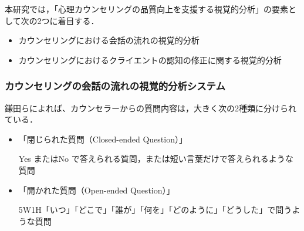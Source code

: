\documentclass[shuuron]{kuee}
\begin{document}
%




本研究では，「心理カウンセリングの品質向上を支援する視覚的分析」の要素として次の2つに着目する．
\begin{itemize}
  \item %
  カウンセリングにおける会話の流れの視覚的分析%
  \item カウンセリングにおけるクライエントの認知の修正に関する視覚的分析
\end{itemize}



\subsubsection{カウンセリングの会話の流れの視覚的分析システム}




鎌田ら\cite{Darshana}によれば、カウンセラーからの質問内容は，大きく次の2種類に分けられている．%
\begin{itemize}
  \item 「閉じられた質問（Closed-ended Question）」

Yes またはNo で答えられる質問，または短い言葉だけで答えられるような質問
  \item 「開かれた質問（Open-ended Question）」

    5W1H「いつ」「どこで」「誰が」「何を」「どのように」「どうした」で問うような質問

\end{itemize}
\end{document}
